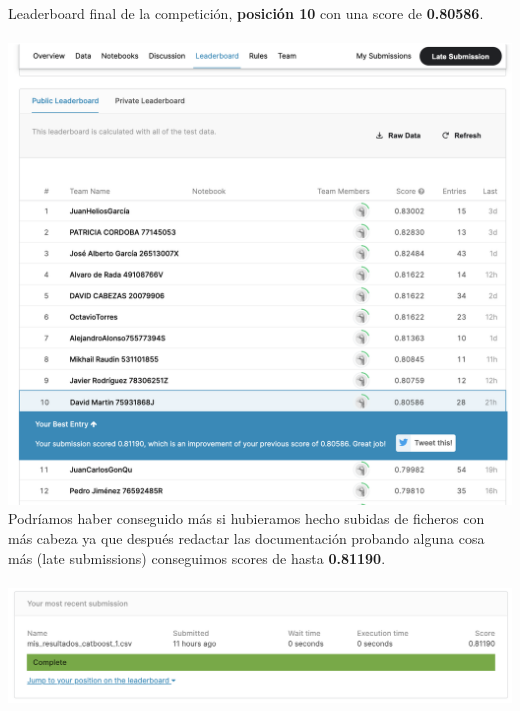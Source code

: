 \documentclass[12pt,twoside]{report}
\date{Curso 2020-2021}
\begin{document}



\clearpage{\pagestyle{empty}\cleardoublepage}
\setcounter{page}{1}
\pagestyle{fancy}


\clearpage{\pagestyle{empty}\cleardoublepage}


Leaderboard final de la competición, \textbf{posición 10} con una score de \textbf{0.80586}.
\\
\\
\includegraphics[width = \textwidth]{../notebooks/figures/leaderboard}\\

Podríamos haber conseguido más si hubieramos hecho subidas de ficheros con más cabeza ya que después redactar las documentación probando alguna cosa más (late submissions) conseguimos scores de hasta \textbf{0.81190}.
\\
\\
\includegraphics[width = \textwidth]{../notebooks/figures/late}\\
\end{document}
